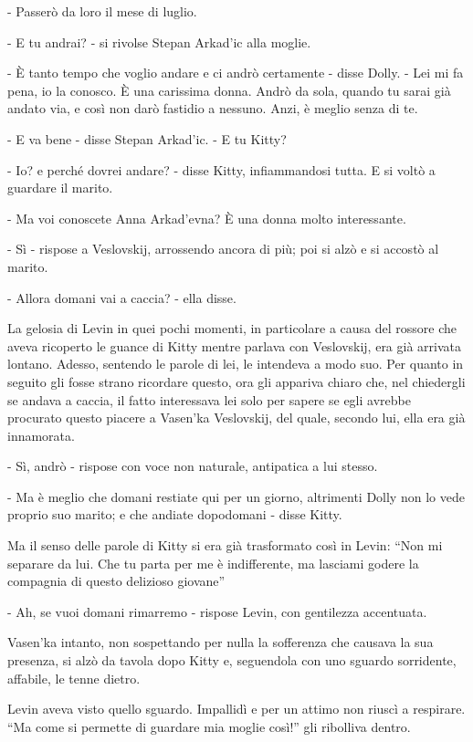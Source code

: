 - Passerò da loro il mese di luglio. 

- E tu andrai? - si rivolse Stepan Arkad'ic alla moglie. 

- È tanto tempo che voglio andare e ci andrò certamente - disse Dolly. - Lei mi fa pena, io la conosco. È una carissima donna. Andrò da sola, quando tu sarai già andato via, e così non darò fastidio a nessuno. Anzi, è meglio senza di te. 

- E va bene - disse Stepan Arkad'ic. - E tu Kitty? 

- Io? e perché dovrei andare? - disse Kitty, infiammandosi tutta. E si voltò a guardare il marito. 

- Ma voi conoscete Anna Arkad'evna? È una donna molto interessante. 

- Sì - rispose a Veslovskij, arrossendo ancora di più; poi si alzò e si accostò al marito. 

- Allora domani vai a caccia? - ella disse. 

La gelosia di Levin in quei pochi momenti, in particolare a causa del rossore che aveva ricoperto le guance di Kitty mentre parlava con Veslovskij, era già arrivata lontano. Adesso, sentendo le parole di lei, le intendeva a modo suo. Per quanto in seguito gli fosse strano ricordare questo, ora gli appariva chiaro che, nel chiedergli se andava a caccia, il fatto interessava lei solo per sapere se egli avrebbe procurato questo piacere a Vasen'ka Veslovskij, del quale, secondo lui, ella era già innamorata. 

- Sì, andrò - rispose con voce non naturale, antipatica a lui stesso. 

- Ma è meglio che domani restiate qui per un giorno, altrimenti Dolly non lo vede proprio suo marito; e che andiate dopodomani - disse Kitty. 

Ma il senso delle parole di Kitty si era già trasformato così in Levin: ``Non mi separare da lui. Che tu parta per me è indifferente, ma lasciami godere la compagnia di questo delizioso giovane'' 

- Ah, se vuoi domani rimarremo - rispose Levin, con gentilezza accentuata. 

Vasen'ka intanto, non sospettando per nulla la sofferenza che causava la sua presenza, si alzò da tavola dopo Kitty e, seguendola con uno sguardo sorridente, affabile, le tenne dietro. 

Levin aveva visto quello sguardo. Impallidì e per un attimo non riuscì a respirare. ``Ma come si permette di guardare mia moglie così!'' gli ribolliva dentro. 

